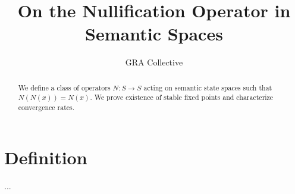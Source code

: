 \documentclass{article}
\title{On the Nullification Operator in Semantic Spaces}
\author{GRA Collective}
\begin{document}
\maketitle
\begin{abstract}
We define a class of operators \(N: S \to S\) acting on semantic state spaces such that \(N(N(x)) = N(x)\). We prove existence of stable fixed points and characterize convergence rates.
\end{abstract}
\section{Definition}
...
\end{document}
